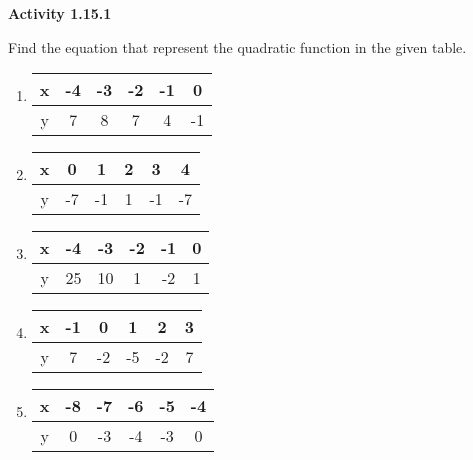 \vspace{1ex}
\noindent\textbf{Activity 1.15.1}

\vspace{0.75ex}

Find the equation that represent the quadratic function in the given table.
\begin{multicols}{2}
\begin{enumerate}[label = \color{blue}\arabic*. ]
\item  \begin{tabular}{|*6{c|}} 
\hline 
x & -4 & -3 & -2 & -1 & 0 \\
\hline 
y & 7 & 8 & 7 & 4 & -1 \\
\hline 
\end{tabular} 
\item  \begin{tabular}{|*6{c|}} 
\hline 
x & 0 & 1 & 2 & 3 & 4 \\
\hline 
y & -7 & -1 & 1 & -1 & -7 \\
\hline 
\end{tabular} 
\item  \begin{tabular}{|*6{c|}} 
\hline 
x & -4 & -3 & -2 & -1 & 0 \\
\hline 
y & 25 & 10 & 1 & -2 & 1 \\
\hline 
\end{tabular} 
\item  \begin{tabular}{|*6{c|}} 
\hline 
x & -1 & 0 & 1 & 2 & 3 \\
\hline 
y & 7 & -2 & -5 & -2 & 7 \\
\hline 
\end{tabular} 
\item  \begin{tabular}{|*6{c|}} 
\hline 
x & -8 & -7 & -6 & -5 & -4 \\
\hline 
y & 0 & -3 & -4 & -3 & 0 \\
\hline 
\end{tabular} 
\end{enumerate}
\end{multicols} 

